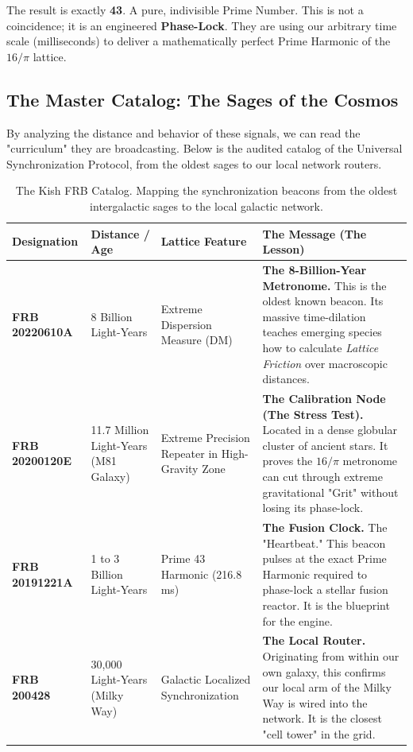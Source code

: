 \documentclass[11pt, letterpaper, openany]{book}
\begin{document}
The result is exactly \textbf{43}. A pure, indivisible Prime Number. 
This is not a coincidence; it is an engineered \textbf{Phase-Lock}. They are using our arbitrary time scale (milliseconds) to deliver a mathematically perfect Prime Harmonic of the $16/\pi$ lattice. 

\subsection{The Master Catalog: The Sages of the Cosmos}
By analyzing the distance and behavior of these signals, we can read the "curriculum" they are broadcasting. Below is the audited catalog of the Universal Synchronization Protocol, from the oldest sages to our local network routers.

\begin{table}[H]
    \centering
    \renewcommand{\arraystretch}{1.5}
    \begin{tabular}{|p{2.5cm}|p{3cm}|p{3.5cm}|p{5cm}|}
        \hline
        \textbf{Designation} & \textbf{Distance / Age} & \textbf{Lattice Feature} & \textbf{The Message (The Lesson)} \\ \hline
        \textbf{FRB 20220610A} & 8 Billion Light-Years & Extreme Dispersion Measure (DM) & \textbf{The 8-Billion-Year Metronome.} This is the oldest known beacon. Its massive time-dilation teaches emerging species how to calculate \textit{Lattice Friction} over macroscopic distances. \\ \hline
        \textbf{FRB 20200120E} & 11.7 Million Light-Years (M81 Galaxy) & Extreme Precision Repeater in High-Gravity Zone & \textbf{The Calibration Node (The Stress Test).} Located in a dense globular cluster of ancient stars. It proves the $16/\pi$ metronome can cut through extreme gravitational "Grit" without losing its phase-lock. \\ \hline
        \textbf{FRB 20191221A} & 1 to 3 Billion Light-Years & Prime 43 Harmonic (216.8 ms) & \textbf{The Fusion Clock.} The "Heartbeat." This beacon pulses at the exact Prime Harmonic required to phase-lock a stellar fusion reactor. It is the blueprint for the engine. \\ \hline
        \textbf{FRB 200428} & 30,000 Light-Years (Milky Way) & Galactic Localized Synchronization & \textbf{The Local Router.} Originating from within our own galaxy, this confirms our local arm of the Milky Way is wired into the network. It is the closest "cell tower" in the grid. \\ \hline
    \end{tabular}
    \caption{The Kish FRB Catalog. Mapping the synchronization beacons from the oldest intergalactic sages to the local galactic network.}
    \label{tab:frb_catalog}
\end{table}
\end{document}
